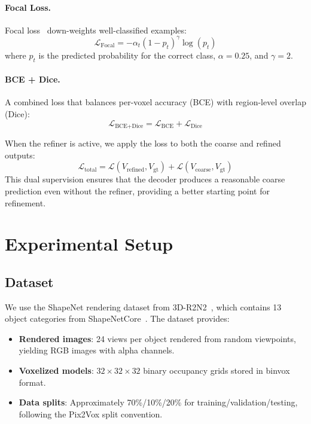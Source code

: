 \documentclass[10pt,twocolumn,letterpaper]{article}
\begin{document}
\paragraph{Focal Loss.} Focal loss~\cite{lin2017focal} down-weights well-classified examples:
\begin{equation}
\mathcal{L}_{\text{Focal}} = -\alpha_t (1 - p_t)^\gamma \log(p_t)
\end{equation}
where $p_t$ is the predicted probability for the correct class, $\alpha = 0.25$, and $\gamma = 2$.

\paragraph{BCE + Dice.} A combined loss that balances per-voxel accuracy (BCE) with region-level overlap (Dice):
\begin{equation}
\mathcal{L}_{\text{BCE+Dice}} = \mathcal{L}_{\text{BCE}} + \mathcal{L}_{\text{Dice}}
\end{equation}

When the refiner is active, we apply the loss to both the coarse and refined outputs:
\begin{equation}
\mathcal{L}_{\text{total}} = \mathcal{L}(V_{\text{refined}}, V_{\text{gt}}) + \mathcal{L}(V_{\text{coarse}}, V_{\text{gt}})
\end{equation}
This dual supervision ensures that the decoder produces a reasonable coarse prediction even without the refiner, providing a better starting point for refinement.

\section{Experimental Setup}
\label{sec:setup}

\subsection{Dataset}

We use the ShapeNet rendering dataset from 3D-R2N2~\cite{choy2016r2n2}, which contains 13 object categories from ShapeNetCore~\cite{chang2015shapenet}. The dataset provides:

\begin{itemize}
    \item \textbf{Rendered images}: 24 views per object rendered from random viewpoints, yielding RGB images with alpha channels.
    \item \textbf{Voxelized models}: $32 \times 32 \times 32$ binary occupancy grids stored in binvox format.
    \item \textbf{Data splits}: Approximately 70\%/10\%/20\% for training/validation/testing, following the Pix2Vox split convention.
\end{itemize}
\end{document}
